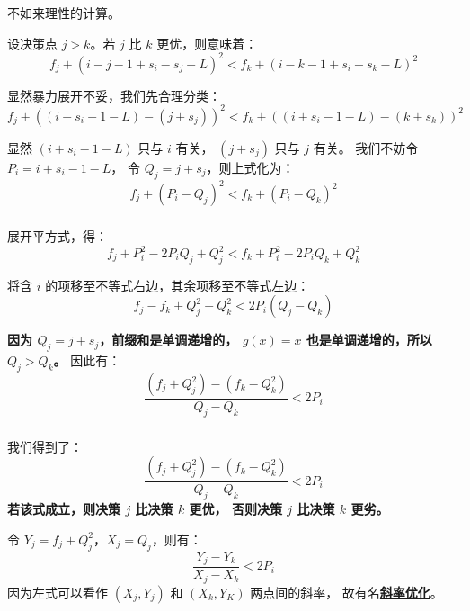 \documentclass[9pt, UTF8]{beamer} %
\newcommand \fts {\frametitle{\insertsubsection}}
\newcommand \bpause { \bigskip \pause }
\begin{document}
	\begin{frame}
		\fts

		不如来理性的计算。

		\bpause

		设决策点 $j > k$。若 $j$ 比 $k$ 更优，则意味着：
		$$
		f_j + (i - j - 1 + s_i - s_j - L)^2 <
		f_k + (i - k - 1 + s_i - s_k - L)^2
		$$

		\pause

		显然暴力展开不妥，我们先合理分类：
		$$
		f_j + ((i + s_i - 1 - L) - (j + s_j))^2 <
		f_k + ((i + s_i - 1 - L) - (k + s_k))^2
		$$

		\pause

		显然 $(i + s_i - 1 - L)$ 只与 $i$ 有关，
		$(j + s_j)$ 只与 $j$ 有关。
		我们不妨令 $P_i = i + s_i - 1 - L$，
		令 $Q_j = j + s_j$，则上式化为：
		$$
		f_j + (P_i - Q_j)^2 <
		f_k + (P_i - Q_k)^2
		$$
	\end{frame}

	\begin{frame}
		\fts

		展开平方式，得：
		$$
		f_j + P_i^2 - 2 P_i Q_j + Q_j^2 <
		f_k + P_i^2 - 2 P_i Q_k + Q_k^2
		$$

		\pause

		将含 $i$ 的项移至不等式右边，其余项移至不等式左边：
		$$
		f_j - f_k + Q_j^2 - Q_k^2 < 2 P_i (Q_j - Q_k)
		$$

		\pause

		\textbf{因为 $Q_j = j + s_j$，前缀和是单调递增的，
		$g(x) = x$ 也是单调递增的，所以 $Q_j > Q_k$。}
		因此有：
		$$
		\frac {(f_j + Q_j^2) - (f_k - Q_k^2)} {Q_j - Q_k} < 2 P_i
		$$
	\end{frame}

	\begin{frame}
		\fts

		我们得到了：
		$$
		\frac {(f_j + Q_j^2) - (f_k - Q_k^2)} {Q_j - Q_k} < 2 P_i
		$$
		\textbf{若该式成立，则决策 $j$ 比决策 $k$ 更优，
		否则决策 $j$ 比决策 $k$ 更劣。}

		\bpause

		令 $Y_j = f_j + Q_j^2$，$X_j = Q_j$，则有：
		$$
		\frac {Y_j - Y_k} {X_j - X_k} < 2 P_i
		$$
		因为左式可以看作 $(X_j, Y_j)$ 和 $(X_k, Y_K)$ 两点间的斜率，
		故有名\textbf{\uline{斜率优化}}。
	\end{frame}
\end{document}
